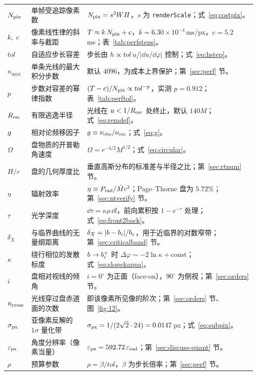 \begin{longtable}{@{}p{2.15cm}p{5.05cm}p{7.05cm}@{}}
$N_{\rm pix}$ & 单帧受追踪像素数 & $N_{\rm pix} = s^2 W H$，$s$ 为 \texttt{renderScale}；式~\eqref{eq:costpix}。\\
$k,\;c$ & 像素线性律的斜率与截距 & $T \approx k\,N_{\rm pix} + c$，$k=6.30\times10^{-4}$\,ms/px，$c=5.2$\,ms；表~\ref{tab:perfsteps}。\\
$tol$ & 自适应步长容差 & 步长由 $h \propto tol\,u/|\dd u/\dd\varphi|$ 控制；式~\eqref{eq:hstep}。\\
$n_{\max}$ & 单条光线的最大积分步数 & 默认 $4096$，为成本上界保护；第~\ref{sec:perf} 节。\\
$p$ & 步数对容差的幂律指数 & $(T-c)/N_{\rm pix}\propto tol^{-p}$，实测 $p=0.912$；表~\ref{tab:perftol}。\\
$R_{\rm esc}$ & 有限逃逸半径 & 光线在 $u<1/R_{\rm esc}$ 处终止，默认 $140M$；式~\eqref{eq:remdef}。\\
$g$ & 相对论频移因子 & $g \equiv \nu_{\rm obs}/\nu_{\rm em}$；式~\eqref{eq:g}。\\
$\Omega$ & 盘物质的开普勒角速度 & $\Omega = r^{-3/2}M^{1/2}$；式~\eqref{eq:circular}。\\
$H/r$ & 盘的几何厚度比 & 垂直高斯分布的标准差与半径之比；第~\ref{sec:rtnum} 节。\\
$\eta$ & 辐射效率 & $\eta \equiv P_{\rm rad}/\dot M c^2$；Page--Thorne 盘为 $5.72\%$；第~\ref{sec:ntverify} 节。\\
$\tau$ & 光学深度 & $\dd\tau = \kappa\rho\,\dd l$，前向累积按 $1-e^{-\tau}$ 处理；式~\eqref{eq:front2back}。\\
$\delta_X$ & 与临界曲线的无量纲距离 & $\delta_X = |b-b_{c}|/b_{c}$，用于近临界的对数窄带；第~\ref{sec:criticalband} 节。\\
$\kappa$ & 绕行相位的发散标度 & $b\to b_{c}^+$ 时 $\Delta\varphi \sim -2\ln\kappa + \mathrm{const}$；式~\eqref{eq:slopekappa}。\\
$i$ & 盘相对视线的倾角 & $i=0^\circ$ 为正面（face-on），$90^\circ$ 为侧视；第~\ref{sec:orders} 节。\\
$n_{\rm cross}$ & 光线穿过盘赤道面的次数 & 即该像素所见像的阶次；第~\ref{sec:orders} 节、图~\ref{fig:12}。\\
$\sigma_{\rm px}$ & 亚像素反解的 $1\sigma$ 量化带 & $\sigma_{\rm px} = 1/(2\sqrt2\cdot24) = 0.0147$\,px；式~\eqref{eq:subpix}。\\
$\varepsilon_{\rm px}$ & 角度分辨率（像素当量） & $\varepsilon_{\rm px} = 592.72\,\varepsilon_{\rm rad}$；第~\ref{sec:discuss-quant} 节。\\
$\rho$ & 预算参数 & $\rho = \beta/tol$，$\beta$ 为步长倍率；第~\ref{sec:perf} 节。\\
\end{longtable}
\auxrestorecounter
\endgroup

